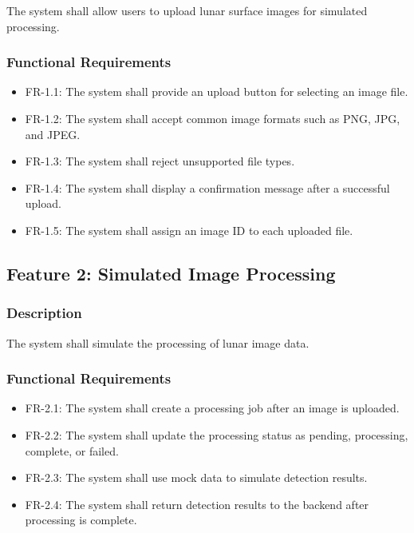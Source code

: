 \documentclass[12pt]{article}
\begin{document}
The system shall allow users to upload lunar surface images for simulated processing.

\subsubsection{Functional Requirements}

\begin{itemize}
    \item FR-1.1: The system shall provide an upload button for selecting an image file.
    \item FR-1.2: The system shall accept common image formats such as PNG, JPG, and JPEG.
    \item FR-1.3: The system shall reject unsupported file types.
    \item FR-1.4: The system shall display a confirmation message after a successful upload.
    \item FR-1.5: The system shall assign an image ID to each uploaded file.
\end{itemize}

\subsection{Feature 2: Simulated Image Processing}

\subsubsection{Description}

The system shall simulate the processing of lunar image data.

\subsubsection{Functional Requirements}

\begin{itemize}
    \item FR-2.1: The system shall create a processing job after an image is uploaded.
    \item FR-2.2: The system shall update the processing status as pending, processing, complete, or failed.
    \item FR-2.3: The system shall use mock data to simulate detection results.
    \item FR-2.4: The system shall return detection results to the backend after processing is complete.
\end{itemize}
\end{document}
